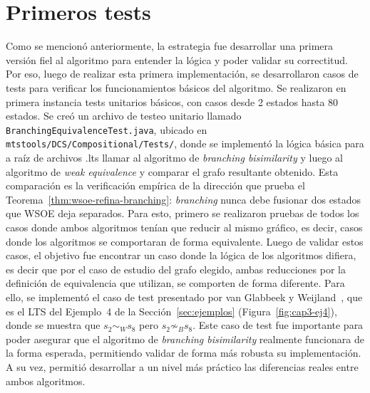 \section{Primeros tests}
\label{sec:tests}
Como se mencionó anteriormente, la estrategia fue desarrollar una primera versión fiel al algoritmo para entender la lógica y poder validar su correctitud. Por eso, luego de realizar esta primera implementación, se desarrollaron casos de tests para verificar los funcionamientos básicos del algoritmo. Se realizaron en primera instancia tests unitarios básicos, con casos desde 2 estados hasta 80 estados. Se creó un archivo de testeo unitario llamado \texttt{BranchingEquivalenceTest.java}, ubicado en \texttt{mtstools/DCS/Compositional/Tests/}, donde se implementó la lógica básica para a raíz de archivos .lts llamar al algoritmo de \textit{branching bisimilarity} y luego al algoritmo de \textit{weak equivalence} y comparar el grafo resultante obtenido. Esta comparación es la verificación empírica de la dirección que prueba el Teorema~\ref{thm:wsoe-refina-branching}: \textit{branching} nunca debe fusionar dos estados que WSOE deja separados.
Para esto, primero se realizaron pruebas de todos los casos donde ambos algoritmos tenían que reducir al mismo gráfico, es decir, casos donde los algoritmos se comportaran de forma equivalente. Luego de validar estos casos, el objetivo fue encontrar un caso donde la lógica de los algoritmos difiera, es decir que por el caso de estudio del grafo elegido, ambas reducciones por la definición de equivalencia que utilizan, se comporten de forma diferente. Para ello, se implementó el caso de test presentado por van Glabbeek y Weijland~\cite{glabbeek1996}, que es el LTS del Ejemplo~4 de la Sección~\ref{sec:ejemplos} (Figura~\ref{fig:cap3-ej4}), donde se muestra que $s_2\sim_{W}s_8$ pero $s_2\not\sim_{B}s_8$. Este caso de test fue importante para poder asegurar que el algoritmo de \textit{branching bisimilarity} realmente funcionara de la forma esperada, permitiendo validar de forma más robusta su implementación. A su vez, permitió desarrollar a un nivel más práctico las diferencias reales entre ambos algoritmos.


